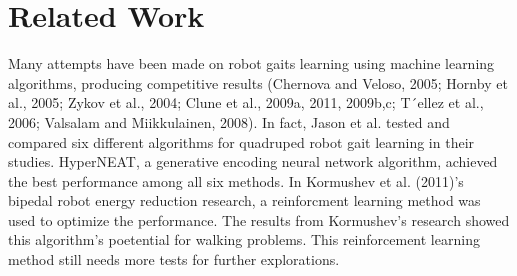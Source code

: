 \section{Related Work}
Many attempts have been made on robot gaits learning using machine learning algorithms, producing competitive results (Chernova and Veloso, 2005; Hornby et al., 2005; Zykov et al., 2004; Clune et al., 2009a, 2011, 2009b,c; T´ellez et al., 2006; Valsalam and Miikkulainen, 2008). In fact, Jason et al. tested and compared six different algorithms for quadruped robot gait learning in their studies. HyperNEAT, a generative encoding neural network algorithm, achieved the best performance among all six methods. In Kormushev et al. (2011)'s bipedal robot energy reduction research, a reinforcment learning method was used to optimize the performance. The results from Kormushev's research showed this algorithm's poetential for walking problems. This reinforcement learning method still needs more tests for further explorations.
